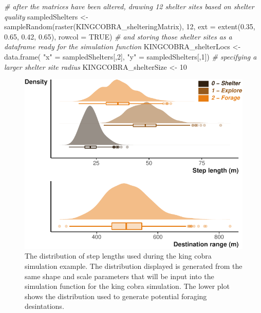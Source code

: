\documentclass[10pt,a4paper]{article}
\newenvironment{Shaded}{}{}
\newcommand{\AttributeTok}[1]{#1}
\newcommand{\CommentTok}[1]{\textit{#1}}
\newcommand{\ConstantTok}[1]{#1}
\newcommand{\DecValTok}[1]{#1}
\newcommand{\FloatTok}[1]{#1}
\newcommand{\FunctionTok}[1]{#1}
\newcommand{\NormalTok}[1]{#1}
\newcommand{\OtherTok}[1]{#1}
\newcommand{\StringTok}[1]{#1}
\begin{document}
\begin{Shaded}
\begin{Highlighting}[]
\CommentTok{\# after the matrices have been altered, drawing 12 shelter sites based on shelter quality}
\NormalTok{sampledShelters }\OtherTok{\textless{}{-}} \FunctionTok{sampleRandom}\NormalTok{(}\FunctionTok{raster}\NormalTok{(KINGCOBRA\_shelteringMatrix), }\DecValTok{12}\NormalTok{,}
                                \AttributeTok{ext =} \FunctionTok{extent}\NormalTok{(}\FloatTok{0.35}\NormalTok{, }\FloatTok{0.65}\NormalTok{, }\FloatTok{0.42}\NormalTok{, }\FloatTok{0.65}\NormalTok{), }
                                \AttributeTok{rowcol =} \ConstantTok{TRUE}\NormalTok{)}
\CommentTok{\# and storing those shelter sites as a dataframe ready for the simulation function}
\NormalTok{KINGCOBRA\_shelterLocs }\OtherTok{\textless{}{-}} \FunctionTok{data.frame}\NormalTok{(}
  \StringTok{"x"} \OtherTok{=}\NormalTok{ sampledShelters[,}\DecValTok{2}\NormalTok{],}
  \StringTok{"y"} \OtherTok{=}\NormalTok{ sampledShelters[,}\DecValTok{1}\NormalTok{])}
\CommentTok{\# specifying a larger shelter site radius}
\NormalTok{KINGCOBRA\_shelterSize }\OtherTok{\textless{}{-}} \DecValTok{10}
\end{Highlighting}
\end{Shaded}

\begin{figure}

{\centering \includegraphics{Agent-based_model_walkthrough_files/figure-latex/KINGCOBRAsettingMoveDesPlot-1} 

}

\caption{The distribution of step lengths used during the king cobra simulation example. The distribution displayed is generated from the same shape and scale parameters that will be input into the simulation function for the king cobra simulation. The lower plot shows the distribution used to generate potential foraging desintations.}\label{fig:KINGCOBRAsettingMoveDesPlot}
\end{figure}
\end{document}
